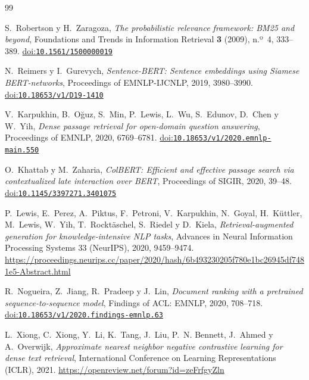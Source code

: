 \documentclass[11pt,letterpaper]{article}
\numberwithin{equation}{section}
\begin{document}
\providecommand{\doi}[1]{\href{https://doi.org/#1}{doi:\nolinkurl{#1}}}
\begin{thebibliography}{99}

S.~Robertson y H.~Zaragoza,
\textit{The probabilistic relevance framework: BM25 and beyond},
Foundations and Trends in Information Retrieval \textbf{3} (2009), n.º~4, 333--389.
\doi{10.1561/1500000019}

N.~Reimers y I.~Gurevych,
\textit{Sentence-BERT: Sentence embeddings using Siamese BERT-networks},
Proceedings of EMNLP-IJCNLP, 2019, 3980--3990.
\doi{10.18653/v1/D19-1410}

V.~Karpukhin, B.~O{\u{g}}uz, S.~Min, P.~Lewis, L.~Wu, S.~Edunov, D.~Chen y W.~Yih,
\textit{Dense passage retrieval for open-domain question answering},
Proceedings of EMNLP, 2020, 6769--6781.
\doi{10.18653/v1/2020.emnlp-main.550}

O.~Khattab y M.~Zaharia,
\textit{ColBERT: Efficient and effective passage search via contextualized late interaction over BERT},
Proceedings of SIGIR, 2020, 39--48.
\doi{10.1145/3397271.3401075}

P.~Lewis, E.~Perez, A.~Piktus, F.~Petroni, V.~Karpukhin, N.~Goyal, H.~K{\"u}ttler, M.~Lewis, W.~Yih, T.~Rockt{\"a}schel, S.~Riedel y D.~Kiela,
\textit{Retrieval-augmented generation for knowledge-intensive NLP tasks},
Advances in Neural Information Processing Systems 33 (NeurIPS), 2020, 9459--9474.
\url{https://proceedings.neurips.cc/paper/2020/hash/6b493230205f780e1bc26945df7481e5-Abstract.html}

R.~Nogueira, Z.~Jiang, R.~Pradeep y J.~Lin,
\textit{Document ranking with a pretrained sequence-to-sequence model},
Findings of ACL: EMNLP, 2020, 708--718.
\doi{10.18653/v1/2020.findings-emnlp.63}

L.~Xiong, C.~Xiong, Y.~Li, K.~Tang, J.~Liu, P.~N. Bennett, J.~Ahmed y A.~Overwijk,
\textit{Approximate nearest neighbor negative contrastive learning for dense text retrieval},
International Conference on Learning Representations (ICLR), 2021.
\url{https://openreview.net/forum?id=zeFrfgyZln}


\end{thebibliography}
\end{document}
